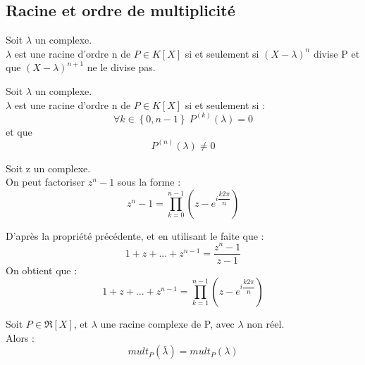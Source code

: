 \subsection{Racine et ordre de multiplicité}
\begin{de}
Soit $\lambda$ un complexe.\\
$\lambda$ est une racine d'ordre n de $P \in K[X]$ si et seulement si $(X-\lambda)^n$ divise P et que $(X-\lambda)^{n+1}$ ne le divise pas.
\end{de}
\begin{prop}
Soit $\lambda$ un complexe.\\
$\lambda$ est une racine d'ordre n de $P \in K[X]$ si et seulement si :
$$\forall k \in \left\lbrace0,n-1\right\rbrace~ P^{(k)}(\lambda) = 0 $$
et que
$$P^{(n)}(\lambda) \neq 0$$
\end{prop}
\begin{prop}
Soit z un complexe.\\
On peut factoriser $z^n-1$ sous la forme : 
$$z^n-1 = \prod_{k=0}^{n-1}(z-e^{i\dfrac{k2\pi}{n}})$$
\end{prop}
\begin{prop}
D'après la propriété précédente, et en utilisant le faite que :
$$1 + z + ... +z^{n-1} = \dfrac{z^{n}-1}{z-1}$$
On obtient que : 
$$1 + z + ... +z^{n-1} =  \prod_{k=1}^{n-1}(z-e^{i\dfrac{k2\pi}{n}})$$
\end{prop}
\begin{prop}
Soit $P\in\Re[X]$, et $\lambda$ une racine complexe de P, avec $\lambda$ non réel.\\
Alors :
$$mult_P(\bar{\lambda}) = mult_P(\lambda)$$
\end{prop}
